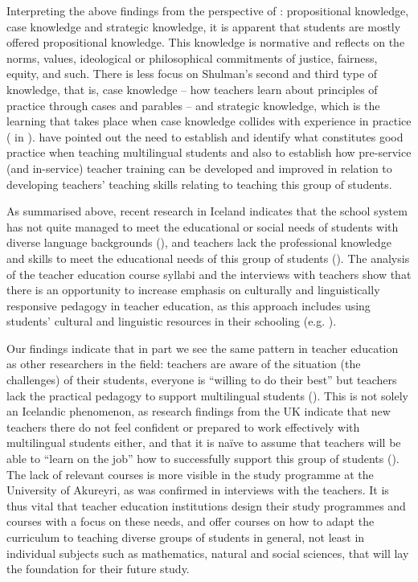 \documentclass[output=paper]{langscibook}
\begin{document}
Interpreting the above findings from the perspective of \citet{Shulman1986}: propositional knowledge, case knowledge and strategic knowledge, it is apparent that students are mostly offered propositional knowledge. This knowledge is normative and reflects on the norms, values, ideological or philosophical commitments of justice, fairness, equity, and such. There is less focus on Shulman’s second and third type of knowledge, that is, case knowledge – how teachers learn about principles of practice through cases and parables – and strategic knowledge, which is the learning that takes place when case knowledge collides with experience in practice (\citealt{Shulman2007} in \citealt[192]{FlorianRouse2010}). \citet{FlocktonCunningham2021} have pointed out the need to establish and identify what constitutes good practice when teaching multilingual students and also to establish how pre-service (and in-service) teacher training can be developed and improved in relation to developing teachers’ teaching skills relating to teaching this group of students.

As summarised above, recent research in Iceland indicates that the school system has not quite managed to meet the educational or social needs of students with diverse language backgrounds (\citealt{Gumundsdottir2013, Runarsdottir2015-1, Orisdottir2018-1}), and teachers lack the professional knowledge and skills to meet the educational needs of this group of students (\citealt{Gunnorsdottir2020-1}). The analysis of the teacher education course syllabi and the interviews with teachers show that there is an opportunity to increase emphasis on culturally and linguistically responsive pedagogy in teacher education, as this approach includes using students’ cultural and linguistic resources in their schooling (e.g. \citealt{BaileyMarsden2017}).

Our findings indicate that in part we see the same pattern in teacher education as other researchers in the field: teachers are aware of the situation (the challenges) of their students, everyone is “willing to do their best” but teachers lack the practical pedagogy to support multilingual students (\citealt{FlocktonCunningham2021, Gunnorsdottir2020-1, chapters/6_iversen, Oskarsdottir2017-1}). This is not solely an Icelandic phenomenon, as research findings from the UK indicate that new teachers there do not feel confident or prepared to work effectively with multilingual students either, and that it is naïve to assume that teachers will be able to “learn on the job” how to successfully support this group of students (\citealt{FlocktonCunningham2021}). The lack of relevant courses is more visible in the study programme at the University of Akureyri, as was confirmed in interviews with the teachers. It is thus vital that teacher education institutions design their study programmes and courses with a focus on these needs, and offer courses on how to adapt the curriculum to teaching diverse groups of students in general, not least in individual subjects such as mathematics, natural and social sciences, that will lay the foundation for their future study.
\end{document}
